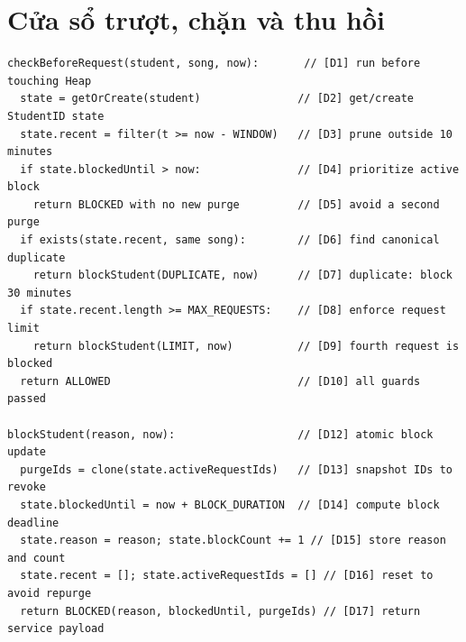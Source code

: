 \documentclass[12pt,a4paper,twoside,openright]{report}
\begin{document}
\section{Cửa sổ trượt, chặn và thu hồi}
\begin{lstlisting}[style=algorithm]
checkBeforeRequest(student, song, now):       // [D1] run before touching Heap
  state = getOrCreate(student)               // [D2] get/create StudentID state
  state.recent = filter(t >= now - WINDOW)   // [D3] prune outside 10 minutes
  if state.blockedUntil > now:               // [D4] prioritize active block
    return BLOCKED with no new purge         // [D5] avoid a second purge
  if exists(state.recent, same song):        // [D6] find canonical duplicate
    return blockStudent(DUPLICATE, now)      // [D7] duplicate: block 30 minutes
  if state.recent.length >= MAX_REQUESTS:    // [D8] enforce request limit
    return blockStudent(LIMIT, now)          // [D9] fourth request is blocked
  return ALLOWED                             // [D10] all guards passed

blockStudent(reason, now):                   // [D12] atomic block update
  purgeIds = clone(state.activeRequestIds)   // [D13] snapshot IDs to revoke
  state.blockedUntil = now + BLOCK_DURATION  // [D14] compute block deadline
  state.reason = reason; state.blockCount += 1 // [D15] store reason and count
  state.recent = []; state.activeRequestIds = [] // [D16] reset to avoid repurge
  return BLOCKED(reason, blockedUntil, purgeIds) // [D17] return service payload
\end{lstlisting}
\end{document}
